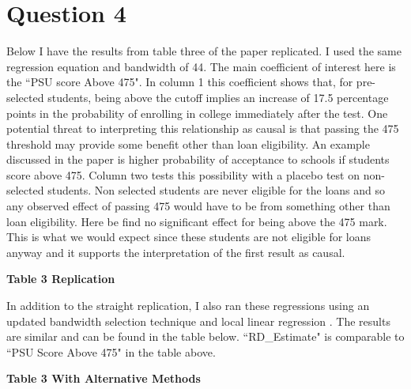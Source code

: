 \documentclass[11pt]{article}
\begin{document}
\section{ Question 4}

Below I have the results from table three of the paper replicated. I used the same regression equation and bandwidth of 44. The main coefficient of interest here is the ``PSU score Above 475". In column 1 this coefficient shows that, for pre-selected students, being above the cutoff implies an increase of 17.5 percentage points in the probability of enrolling in college immediately after the test. One potential threat to interpreting this relationship as causal is that passing the 475 threshold may provide some benefit other than loan eligibility. An example discussed in the paper is higher probability of acceptance to schools if students score above 475. Column two tests this possibility with a placebo test on non-selected students. Non selected students are never eligible for the loans and so any observed effect of passing 475 would have to be from something other than loan eligibility. Here be find no significant effect for being above the 475 mark. This is what we would expect since these students are not eligible for loans anyway and it supports the interpretation of the first result as causal. 

\begin{center}
	\textbf{Table 3 Replication}\par\medskip
		

\end{center}


In addition to the straight replication, I also ran these regressions using an updated bandwidth selection technique and local linear regression  \cite{matias_14}. The results are similar and can be found in the table below. ``RD\_Estimate" is comparable to ``PSU Score Above 475" in the table above. 


\begin{center}
		\textbf{Table 3 With Alternative Methods}\par\medskip
	
	
\end{center}



\end{document}
